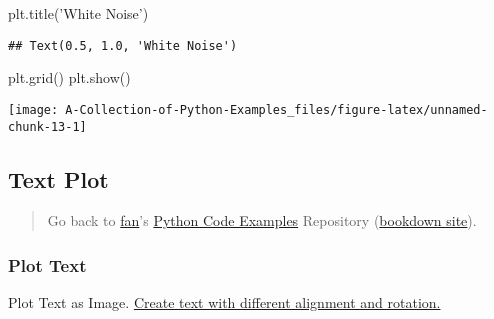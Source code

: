 \documentclass[
]{book}
\newenvironment{Shaded}{\begin{snugshade}}{\end{snugshade}}
\newcommand{\NormalTok}[1]{#1}
\newcommand{\StringTok}[1]{\textcolor[rgb]{0.31,0.60,0.02}{#1}}
\begin{document}
\begin{Shaded}
\begin{Highlighting}[]
\NormalTok{plt.title(}\StringTok{'White Noise'}\NormalTok{)}
\end{Highlighting}
\end{Shaded}

\begin{verbatim}
## Text(0.5, 1.0, 'White Noise')
\end{verbatim}

\begin{Shaded}
\begin{Highlighting}[]
\NormalTok{plt.grid()}
\NormalTok{plt.show()}
\end{Highlighting}
\end{Shaded}

\begin{center}\texttt{[image: A-Collection-of-Python-Examples\_files/figure-latex/unnamed-chunk-13-1]} \end{center}

\hypertarget{text-plot}{%
\subsection{Text Plot}\label{text-plot}}

\begin{quote}
Go back to \href{http://fanwangecon.github.io/}{fan}'s \href{https://fanwangecon.github.io/pyfan/}{Python Code Examples} Repository (\href{https://fanwangecon.github.io/pyfan/bookdown}{bookdown site}).
\end{quote}

\hypertarget{plot-text}{%
\subsubsection{Plot Text}\label{plot-text}}

Plot Text as Image. \href{https://matplotlib.org/3.1.1/gallery/pyplots/text_layout.html\#sphx-glr-gallery-pyplots-text-layout-py}{Create text with different alignment and rotation.}
\end{document}
